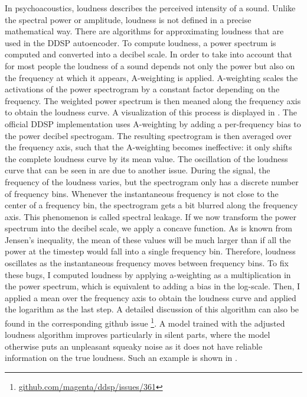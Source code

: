 In psychoacoustics, loudness describes the perceived intensity of a sound.
Unlike the spectral power or amplitude, loudness is not defined in a precise mathematical way.
There are algorithms for approximating loudness that are used in the DDSP autoencoder.
To compute loudness, a power spectrum is computed and converted into a decibel scale.
In order to take into account that for most people the loudness of a sound depends not only the power but also on the frequency at which it appears, A-weighting is applied. A-weighting scales the activations of the power spectrogram by a constant factor depending on the frequency.
The weighted power spectrum is then meaned along the frequency axis to obtain the loudness curve.
A visualization of this process is displayed in . \newline
The official DDSP implementation uses A-weighting by adding a per-frequency bias to the power decibel spectrogam. The resulting spectrogram is then averaged over the frequency axis, such that the A-weighting becomes ineffective: it only shifts the complete loudness curve by its mean value.  \newline
The oscillation of the loudness curve that can be seen in  are due to another issue.
During the signal, the frequency of the loudness varies, but the spectrogram only has a discrete number of frequency bins.
Whenever the instantaneous frequency is not close to the center of a frequency bin, the spectrogram gets a bit blurred along the frequency axis. This phenomenon is called spectral leakage.
If we now transform the power spectrum into the decibel scale, we apply a concave function. As is known from Jensen's inequality, the mean of these values will be much larger than if all the power at the timestep would fall into a single frequency bin. Therefore, loudness oscillates as the instantaneous frequency moves between frequency bins. \newline
To fix these bugs, I computed loudness by applying a-weighting as a multiplication in the power spectrum, which is equivalent to adding a bias in the log-scale.
Then, I applied a mean over the frequency axis to obtain the loudness curve and applied the logarithm as the last step. A detailed discussion of this algorithm can also be found in the corresponding github issue \footnote{\href{https://github.com/magenta/ddsp/issues/361}{github.com/magenta/ddsp/issues/361}}.
A model trained with the adjusted loudness algorithm improves particularly in silent parts, where the model otherwise puts an unpleasant squeaky noise as it does not have reliable information on the true loudness. Such an example is shown in .


